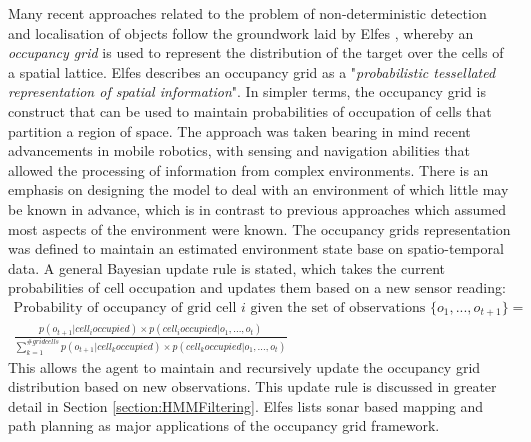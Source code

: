 Many recent approaches related to the problem of non-deterministic detection and localisation of objects follow the groundwork laid by Elfes \cite{Elfes1989UsingNavigation}, whereby an \textit{occupancy grid} is used to represent the distribution of the target over the cells of a spatial lattice. Elfes describes an occupancy grid as a "\textit{probabilistic tessellated representation of spatial information}". In simpler terms, the occupancy grid is construct that can be used to maintain probabilities of occupation of cells that partition a region of space. %
The approach was taken bearing in mind recent advancements in mobile robotics, with sensing and navigation abilities that allowed the processing of information from complex environments. There is an emphasis on designing the model to deal with an environment of which little may be known in advance, which is in contrast to previous approaches which assumed most aspects of the environment were known. The occupancy grids representation was defined to maintain an estimated environment state base on spatio-temporal data. A general Bayesian update rule is stated, which takes the current probabilities of cell occupation and updates them based on a new sensor reading: 
\begin{gather*}%
  \text{Probability of occupancy of grid cell } i \text{ given the set of observations } \{o_1, ..., o_{t+1}\} = \\
\frac{p(o_{t+1} | cell_i occupied) \times p(cell_i occupied | o_1, ..., o_t)}{\sum_{k=1}^{\# grid cells} p(o_{t+1} | cell_k occupied) \times p(cell_k occupied | o_1, ..., o_t)}
\end{gather*}
This allows the agent to maintain and recursively update the occupancy grid distribution based on new observations. This update rule is discussed in greater detail in Section \ref{section:HMMFiltering}. Elfes lists sonar based mapping and path planning as major applications of the occupancy grid framework.


